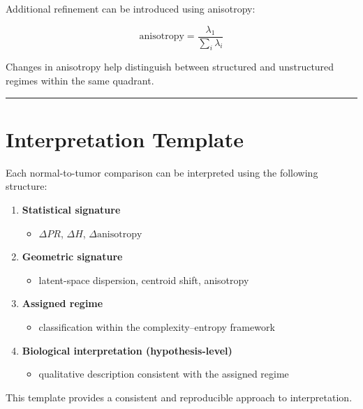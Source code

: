 \documentclass[
  letterpaper,
  DIV=11,
  numbers=noendperiod,
  openany,
  oneside]{scrreprt}
\providecommand{\tightlist}{%
  \setlength{\itemsep}{0pt}\setlength{\parskip}{0pt}}
\begin{document}
Additional refinement can be introduced using anisotropy:

\[
\text{anisotropy} = \frac{\lambda_1}{\sum_i \lambda_i}
\]

Changes in anisotropy help distinguish between structured and
unstructured regimes within the same quadrant.

\begin{center}\rule{0.5\linewidth}{0.5pt}\end{center}

\section{Interpretation Template}\label{interpretation-template}

Each normal-to-tumor comparison can be interpreted using the following
structure:

\begin{enumerate}
\def\labelenumi{\arabic{enumi}.}
\tightlist
\item
  \textbf{Statistical signature}

  \begin{itemize}
  \tightlist
  \item
    \(\Delta PR\), \(\Delta H\), \(\Delta \text{anisotropy}\)
  \end{itemize}
\item
  \textbf{Geometric signature}

  \begin{itemize}
  \tightlist
  \item
    latent-space dispersion, centroid shift, anisotropy
  \end{itemize}
\item
  \textbf{Assigned regime}

  \begin{itemize}
  \tightlist
  \item
    classification within the complexity--entropy framework
  \end{itemize}
\item
  \textbf{Biological interpretation (hypothesis-level)}

  \begin{itemize}
  \tightlist
  \item
    qualitative description consistent with the assigned regime
  \end{itemize}
\end{enumerate}

This template provides a consistent and reproducible approach to
interpretation.
\end{document}
